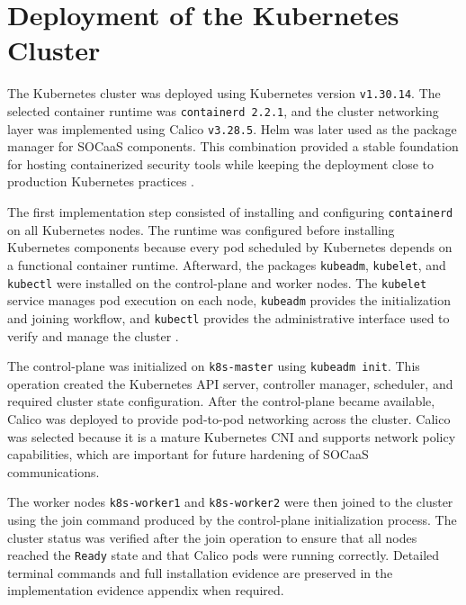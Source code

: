 \section{Deployment of the Kubernetes Cluster}
\label{sec:ch4-kubernetes-deployment}

The Kubernetes cluster was deployed using Kubernetes version \texttt{v1.30.14}. The selected container runtime was \texttt{containerd 2.2.1}, and the cluster networking layer was implemented using Calico \texttt{v3.28.5}. Helm was later used as the package manager for SOCaaS components. This combination provided a stable foundation for hosting containerized security tools while keeping the deployment close to production Kubernetes practices \cite{kubernetes-container-runtimes,containerd-docs,calico-docs}.

The first implementation step consisted of installing and configuring \texttt{containerd} on all Kubernetes nodes. The runtime was configured before installing Kubernetes components because every pod scheduled by Kubernetes depends on a functional container runtime. Afterward, the packages \texttt{kubeadm}, \texttt{kubelet}, and \texttt{kubectl} were installed on the control-plane and worker nodes. The \texttt{kubelet} service manages pod execution on each node, \texttt{kubeadm} provides the initialization and joining workflow, and \texttt{kubectl} provides the administrative interface used to verify and manage the cluster \cite{kubeadm-install}.

The control-plane was initialized on \texttt{k8s-master} using \texttt{kubeadm init}. This operation created the Kubernetes API server, controller manager, scheduler, and required cluster state configuration. After the control-plane became available, Calico was deployed to provide pod-to-pod networking across the cluster. Calico was selected because it is a mature Kubernetes CNI and supports network policy capabilities, which are important for future hardening of SOCaaS communications.

The worker nodes \texttt{k8s-worker1} and \texttt{k8s-worker2} were then joined to the cluster using the join command produced by the control-plane initialization process. The cluster status was verified after the join operation to ensure that all nodes reached the \texttt{Ready} state and that Calico pods were running correctly. Detailed terminal commands and full installation evidence are preserved in the implementation evidence appendix when required.

